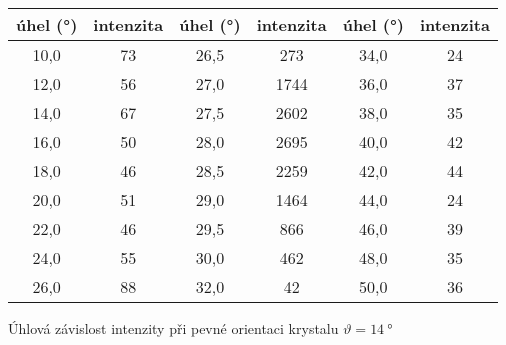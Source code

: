 \begin{tabulka}[p]
\centering
\begin{tabular}{cc|cc|cc}
úhel (\si{\degree}) & intenzita & úhel (\si{\degree}) & intenzita & úhel (\si{\degree}) & intenzita \\ \hline
10,0 & 73 & 26,5 & 273 & 34,0 & 24 \\ 
12,0 & 56 & 27,0 & 1744 & 36,0 & 37 \\ 
14,0 & 67 & 27,5 & 2602 & 38,0 & 35 \\ 
16,0 & 50 & 28,0 & 2695 & 40,0 & 42 \\ 
18,0 & 46 & 28,5 & 2259 & 42,0 & 44 \\ 
20,0 & 51 & 29,0 & 1464 & 44,0 & 24 \\ 
22,0 & 46 & 29,5 & 866 & 46,0 & 39 \\ 
24,0 & 55 & 30,0 & 462 & 48,0 & 35 \\ 
26,0 & 88 & 32,0 & 42 & 50,0 & 36 \\
\end{tabular}
\caption{Úhlová závislost intenzity při pevné orientaci krystalu $\vartheta=\SI{14}{\degree}$}
\label{t:uhel}
\end{tabulka}


